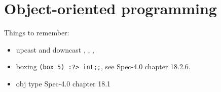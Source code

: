 \chapter{Object-oriented programming}
\label{chap:oop}
Things to remember: 
\begin{itemize}
\item upcast and downcast , \token{:>},
  , 
\item boxing \lstinline|(box 5) :?> int;;|, see Spec-4.0 chapter
  18.2.6.
\item obj type Spec-4.0 chapter 18.1
\end{itemize}
